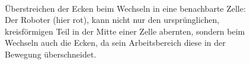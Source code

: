 \documentclass{article}
\begin{document}
\begin{figure}[!ht]
  \centering
   \qquad
  \\
   \qquad
  \caption{Überstreichen der Ecken beim Wechseln in eine benachbarte Zelle: Der Roboter (hier rot),
  kann nicht nur den ursprünglichen, kreisförmigen Teil in der Mitte einer Zelle abernten, 
  sondern beim Wechseln auch die Ecken, da sein Arbeitsbereich diese in der Bewegung überschneidet. }
  \label{fig:harvested_edges}
\end{figure}
\end{document}
